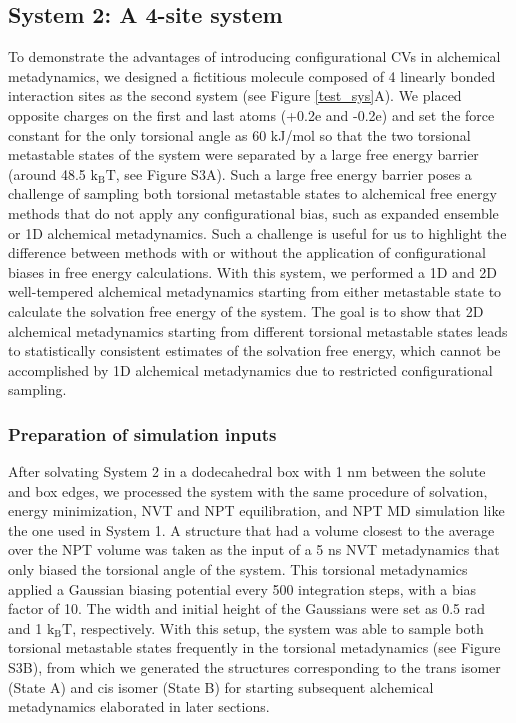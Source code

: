 \documentclass[journal=jacsat,manuscript=article]{achemso}
\begin{document}
\subsection{System 2: A 4-site system}
To demonstrate the advantages of introducing configurational CVs in alchemical metadynamics, we designed a fictitious molecule composed of 4 linearly bonded interaction sites as the second system (see Figure \ref{test_sys}A). We placed opposite charges on the first and last atoms (+0.2e and -0.2e) and set the force constant for the only torsional angle as 60 kJ/mol so that the two torsional metastable states of the system were separated by a large free energy barrier (around 48.5 $\text{k}_{\text{B}}\text{T}$, see Figure S3A). Such a large free energy barrier poses a challenge of sampling both torsional metastable states to alchemical free energy methods that do not apply any configurational bias, such as expanded ensemble or 1D alchemical metadynamics. Such a challenge is useful for us to highlight the difference between methods with or without the application of configurational biases in free energy calculations. With this system, we performed a 1D and 2D well-tempered alchemical metadynamics starting from either metastable state to calculate the solvation free energy of the system. The goal is to show that 2D alchemical metadynamics starting from different torsional metastable states leads to statistically consistent estimates of the solvation free energy, which cannot be accomplished by 1D alchemical metadynamics due to restricted configurational sampling. 

\subsubsection{Preparation of simulation inputs}
After solvating System 2 in a dodecahedral box with 1 nm between the solute and box edges, we processed the system with the same procedure of solvation, energy minimization, NVT and NPT equilibration, and NPT MD simulation like the one used in System 1. A structure that had a volume closest to the average over the NPT volume was taken as the input of a 5 ns NVT metadynamics that only biased the torsional angle of the system. This torsional metadynamics applied a Gaussian biasing potential every 500 integration steps, with a bias factor of 10. The width and initial height of the Gaussians were set as 0.5 rad and 1 $\text{k}_{\text{B}}\text{T}$, respectively. With this setup, the system was able to sample both torsional metastable states frequently in the torsional metadynamics (see Figure S3B), from which we generated the structures corresponding to the trans isomer (State A) and cis isomer (State B) for starting subsequent alchemical metadynamics elaborated in later sections. 
\end{document}
